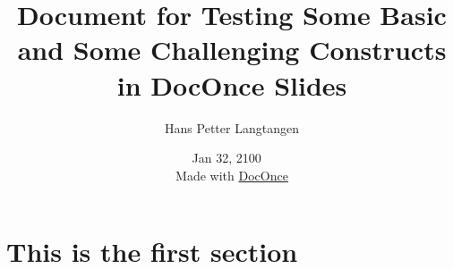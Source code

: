 \documentclass[handout]{beamer}
\newcounter{doconce:movie:counter}
\begin{document}
\newcommand{\exercisesection}[1]{\subsection*{#1}}




\title{Document for Testing Some Basic and Some Challenging Constructs in DocOnce Slides}
\author{Hans Petter Langtangen}
\date{Jan 32, 2100
\ \\ 
{\tiny Made with \href{https://github.com/doconce/doconce}{DocOnce}}
}

\begin{frame}
\titlepage
\end{frame}

\section[First]{This is the first section}
\end{document}
